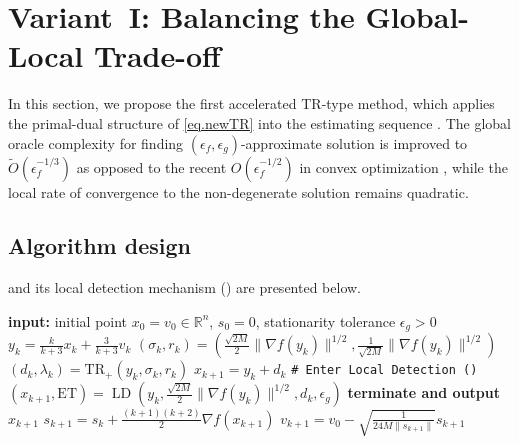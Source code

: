 \documentclass{article}
\numberwithin{equation}{section}
\newcommand{\atr}{\Cref{alg.accelerated utr}}
\newcommand{\trp}{\textrm{TR}_+}
\numberwithin{equation}{section}
\begin{document}
\section{Variant~I: Balancing the Global-Local Trade-off}\label{sec.first variant}
In this section, we propose the first accelerated TR-type method, which applies the primal-dual structure of \ref{eq.newTR} into the estimating sequence \cite{nesterov2008accelerating}. The global oracle complexity for finding $(\epsilon_f,\epsilon_g)$-approximate solution is improved to $\tilde O(\epsilon_f^{-1/3})$ as opposed to the recent $O(\epsilon_f^{-1/2})$ in convex optimization \cite{jiang2026beyond}, while the local rate of convergence to the non-degenerate solution remains quadratic.
\subsection{Algorithm design}
 and its local detection mechanism () are presented below.
\begin{algorithm}[ht]
    \caption{Accelerated Trust-Region Method with Local Detection (\atr{})}\label{alg.accelerated utr}
    \begin{algorithmic}[1]
        \STATE \textbf{input:} initial point $x_0=v_0\in \mathbb{R}^n$, $s_0=0$, stationarity tolerance $\epsilon_g>0$
        \STATE $y_k = \frac{k}{k+3}x_k+\frac{3}{k+3}v_k$
        \STATE $(\sigma_k,r_k) = (\tfrac{\sqrt{2M}}{2}\|\nabla f(y_k)\|^{1/2},\tfrac{1}{\sqrt{2M}}\|\nabla f(y_k)\|^{1/2})$
        \label{line.set-params}
        \STATE $(d_k,\lambda_k) = \trp(y_k,\sigma_k,r_k)$
        \STATE $x_{k+1} = y_k+d_k$
         \label{line.if}
        \STATE \texttt{\# Enter Local Detection ()}
        \STATE $(x_{k+1},\text{ET}) = \operatorname{LD}(y_k,\tfrac{\sqrt{2M}}{2}\|\nabla f(y_k)\|^{1/2},d_k,\epsilon_g)$
        \label{line.early terminate main}
        \STATE \textbf{terminate and output $x_{k+1}$}
        \ENDIF
        \ENDIF
        \STATE $s_{k+1} = s_{k}+\tfrac{(k+1)(k+2)}{2}\nabla f(x_{k+1})$
        \label{line.update-s}
        \STATE $v_{k+1} = v_0-\sqrt{\tfrac{1}{24M\|s_{k+1}\|}}s_{k+1}$
        \label{line.update-v}
        \ENDFOR
    \end{algorithmic}
\end{algorithm}
\end{document}
